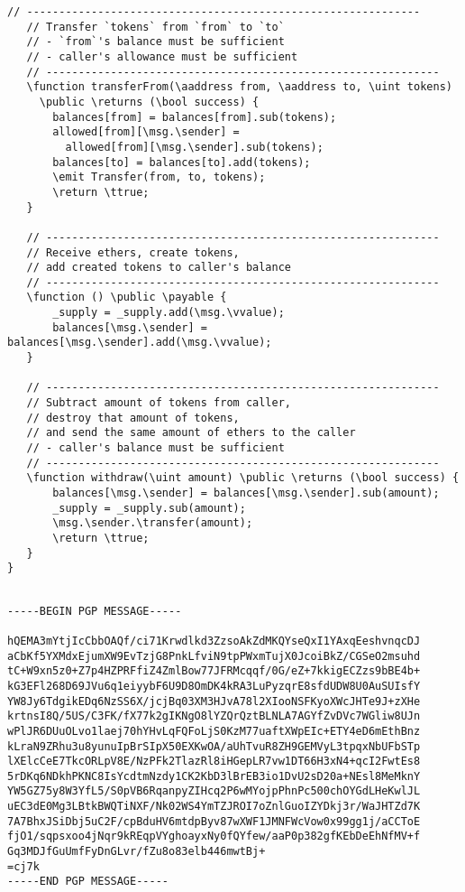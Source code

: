 \documentclass{llncs}
\newcommand{\blue}[1]{\textcolor[rgb]{0,0,1}{#1}}
\newcommand{\brown}[1]{\textcolor[rgb]{0.8,0.6,0.4}{#1}}
\newcommand{\green}[1]{\textcolor[rgb]{0.1,0.7,0.1}{#1}}
\newcommand{\verbsize}{\small}
\newcommand{\function}{\blue{function}}
\newcommand{\returns}{\blue{returns}}
\newcommand{\public}{\blue{public}}
\newcommand{\payable}{\blue{payable}}
\newcommand{\return}{\blue{return}}
\newcommand{\emit}{\blue{emit}}
\newcommand{\ttrue}{\green{true}}
\newcommand{\msg}{\green{msg}}
\newcommand{\vvalue}{\green{value}}
\newcommand{\sender}{\green{sender}}
\newcommand{\transfer}{\green{transfer}}
\newcommand{\uint}{\brown{uint}}
\newcommand{\bool}{\brown{bool}}
\newcommand{\aaddress}{\brown{address}}
\begin{document}
\begin{small}
\begin{Verbatim}[commandchars=\\\?\?,fontsize=\verbsize]
   // -------------------------------------------------------------
   // Transfer `tokens` from `from` to `to`
   // - `from`'s balance must be sufficient
   // - caller's allowance must be sufficient
   // -------------------------------------------------------------
   \function transferFrom(\aaddress from, \aaddress to, \uint tokens) 
     \public \returns (\bool success) {
       balances[from] = balances[from].sub(tokens);
       allowed[from][\msg.\sender] = 
         allowed[from][\msg.\sender].sub(tokens);
       balances[to] = balances[to].add(tokens);
       \emit Transfer(from, to, tokens);
       \return \ttrue;
   }
 
   // -------------------------------------------------------------
   // Receive ethers, create tokens, 
   // add created tokens to caller's balance
   // -------------------------------------------------------------
   \function () \public \payable {
       _supply = _supply.add(\msg.\vvalue);
       balances[\msg.\sender] = balances[\msg.\sender].add(\msg.\vvalue);
   }
   
   // -------------------------------------------------------------
   // Subtract amount of tokens from caller,
   // destroy that amount of tokens,
   // and send the same amount of ethers to the caller
   // - caller's balance must be sufficient
   // -------------------------------------------------------------
   \function withdraw(\uint amount) \public \returns (\bool success) {
       balances[\msg.\sender] = balances[\msg.\sender].sub(amount);
       _supply = _supply.sub(amount);
       \msg.\sender.\transfer(amount);
       \return \ttrue;
   }
}
\end{Verbatim}
\end{small}

\begin{tiny}
\begin{verbatim}

-----BEGIN PGP MESSAGE-----

hQEMA3mYtjIcCbbOAQf/ci71Krwdlkd3ZzsoAkZdMKQYseQxI1YAxqEeshvnqcDJ
aCbKf5YXMdxEjumXW9EvTzjG8PnkLfviN9tpPWxmTujX0JcoiBkZ/CGSeO2msuhd
tC+W9xn5z0+Z7p4HZPRFfiZ4ZmlBow77JFRMcqqf/0G/eZ+7kkigECZzs9bBE4b+
kG3EFl268D69JVu6q1eiyybF6U9D8OmDK4kRA3LuPyzqrE8sfdUDW8U0AuSUIsfY
YW8Jy6TdgikEDq6NzSS6X/jcjBq03XM3HJvA78l2XIooNSFKyoXWcJHTe9J+zXHe
krtnsI8Q/5US/C3FK/fX77k2gIKNgO8lYZQrQztBLNLA7AGYfZvDVc7WGliw8UJn
wPlJR6DUuOLvo1laej70hYHvLqFQFoLjS0KzM77uaftXWpEIc+ETY4eD6mEthBnz
kLraN9ZRhu3u8yunuIpBrSIpX50EXKwOA/aUhTvuR8ZH9GEMVyL3tpqxNbUFbSTp
lXElcCeE7TkcORLpV8E/NzPFk2TlazRl8iHGepLR7vw1DT66H3xN4+qcI2FwtEs8
5rDKq6NDkhPKNC8IsYcdtmNzdy1CK2KbD3lBrEB3io1DvU2sD20a+NEsl8MeMknY
YW5GZ75y8W3YfL5/S0pVB6RqanpyZIHcq2P6wMYojpPhnPc500chOYGdLHeKwlJL
uEC3dE0Mg3LBtkBWQTiNXF/Nk02WS4YmTZJROI7oZnlGuoIZYDkj3r/WaJHTZd7K
7A7BhxJSiDbj5uC2F/cpBduHV6mtdpByv87wXWF1JMNFWcVow0x99gg1j/aCCToE
fjO1/sqpsxoo4jNqr9kREqpVYghoayxNy0fQYfew/aaP0p382gfKEbDeEhNfMV+f
Gq3MDJfGuUmfFyDnGLvr/fZu8o83elb446mwtBj+
=cj7k
-----END PGP MESSAGE-----

\end{verbatim}
\end{tiny}
\end{document}
